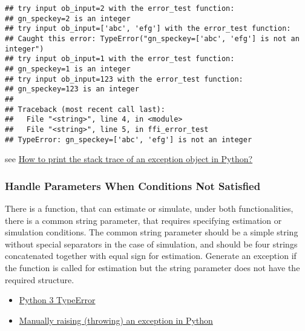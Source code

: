 \documentclass[
]{book}
\providecommand{\tightlist}{%
  \setlength{\itemsep}{0pt}\setlength{\parskip}{0pt}}
\begin{document}
\begin{verbatim}
## try input ob_input=2 with the error_test function:
## gn_speckey=2 is an integer
## try input ob_input=['abc', 'efg'] with the error_test function:
## Caught this error: TypeError("gn_speckey=['abc', 'efg'] is not an integer")
## try input ob_input=1 with the error_test function:
## gn_speckey=1 is an integer
## try input ob_input=123 with the error_test function:
## gn_speckey=123 is an integer
## 
## Traceback (most recent call last):
##   File "<string>", line 4, in <module>
##   File "<string>", line 5, in ffi_error_test
## TypeError: gn_speckey=['abc', 'efg'] is not an integer
\end{verbatim}

see \href{https://stackoverflow.com/q/52742612/8280804}{How to print the stack trace of an exception object in Python?}

\hypertarget{handle-parameters-when-conditions-not-satisfied}{%
\subsubsection{Handle Parameters When Conditions Not Satisfied}\label{handle-parameters-when-conditions-not-satisfied}}

There is a function, that can estimate or simulate, under both functionalities, there is a common string parameter, that requires specifying estimation or simulation conditions. The common string parameter should be a simple string without special separators in the case of simulation, and should be four strings concatenated together with equal sign for estimation. Generate an exception if the function is called for estimation but the string parameter does not have the required structure.

\begin{itemize}
\tightlist
\item
  \href{https://docs.python.org/3/library/exceptions.html\#TypeError}{Python 3 TypeError}
\item
  \href{https://stackoverflow.com/a/30317038/8280804}{Manually raising (throwing) an exception in Python}
\end{itemize}
\end{document}
